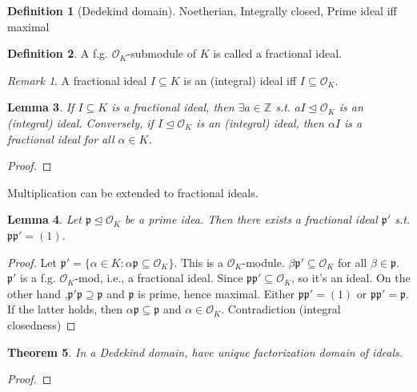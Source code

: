 \documentclass{article}
\theoremstyle{definition}
\newtheorem{defn}{Definition}[section]
\theoremstyle{remark}
\newtheorem{rem}{Remark}
\theoremstyle{plain}
\newtheorem{lem}[defn]{Lemma}
\newtheorem{thm}[defn]{Theorem}
\newcommand{\ZZ}{\mathbb{Z}}
\begin{document}
\begin{defn}[Dedekind domain]
    Noetherian, Integrally closed, Prime ideal iff maximal
\end{defn}
\begin{defn}
    A f.g. $\mathcal O_K$-submodule of $K$ is called a fractional ideal.
\end{defn}
\begin{rem}
    A fractional ideal $I\subseteq K$ is an (integral) ideal iff $I\subseteq \mathcal O_K$.
\end{rem}
\begin{lem}
    If $I\subseteq K$ is a fractional ideal, then $\exists a\in\ZZ$ s.t. $aI\trianglelefteq \mathcal O_K$ is an (integral) ideal. Conversely, if $I\trianglelefteq \mathcal O_K$ is an (integral) ideal, then $\alpha I$ is a fractional ideal for all $\alpha\in K$.
\end{lem}
\begin{proof}
    
\end{proof}
Multiplication can be extended to fractional ideals.
\begin{lem}
    Let $\mathfrak p\trianglelefteq\mathcal O_K$ be a prime idea. Then there exists a fractional ideal $\mathfrak p'$ s.t. $\mathfrak p\mathfrak p'=(1)$.
\end{lem}
\begin{proof}
    Let $\mathfrak p'=\{\alpha\in K:\alpha\mathfrak p\subseteq \mathcal O_K\}$. This is a $\mathcal O_K$-module. $\beta \mathfrak p'\subseteq\mathcal O_K$ for all $\beta\in\mathfrak p$. $\mathfrak p'$ is a f.g. $\mathcal O_K$-mod, i.e., a fractional ideal. Since $\mathfrak p\mathfrak p'\subseteq\mathcal O_K$, so it's an ideal. On the other hand ,$\mathfrak p'\mathfrak p\supseteq \mathfrak p$ and $\mathfrak p$ is prime, hence maximal. Either $\mathfrak p\mathfrak p'=(1)$ or $\mathfrak p\mathfrak p'=\mathfrak p$. If the latter holds, then $\alpha\mathfrak p\subseteq \mathfrak p$ and $\alpha\in\mathcal O_K$. Contradiction (integral closedness)
\end{proof}
\begin{thm}
    In a Dedekind domain, have unique factorization domain of ideals.
\end{thm}
\begin{proof}

\end{proof}
\end{document}
